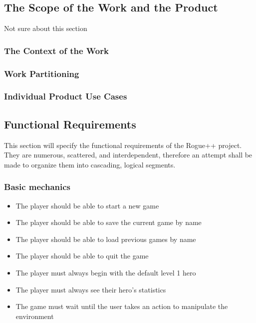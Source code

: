 \documentclass[12pt, titlepage]{article}
\begin{document}
	\subsection{The Scope of the Work and the Product}

		Not sure about this section

		\subsubsection{The Context of the Work}

		\subsubsection{Work Partitioning}

		\subsubsection{Individual Product Use Cases}

	\subsection{Functional Requirements}

	This section will specify the functional requirements of the Rogue++ project. They are numerous, scattered, and interdependent, therefore an attempt shall be made to organize them into cascading, logical segments.

		\subsubsection{Basic mechanics}

		\begin{itemize}
			\item The player should be able to start a new game
			\item The player should be able to save the current game by name
			\item The player should be able to load previous games by name
			\item The player should be able to quit the game
			\item The player must always begin with the default level 1 hero
			\item The player must always see their hero's statistics
			\item The game must wait until the user takes an action to manipulate the environment
		\end{itemize}
\end{document}
